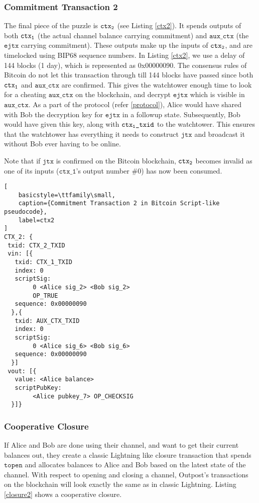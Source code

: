 \subsubsection{Commitment Transaction 2}
The final piece of the puzzle is $\texttt{ctx\textsubscript{2}}$ (see Listing \ref{ctx2}). It spends outputs of both $\texttt{ctx\textsubscript{1}}$ (the actual channel balance carrying commitment) and $\texttt{aux\_ctx}$ (the $\texttt{ejtx}$ carrying commitment). These outputs make up the inputs of $\texttt{ctx\textsubscript{2}}$, and are timelocked using BIP68 \cite{BIP68} sequence numbers. In Listing \ref{ctx2}, we use a delay of 144 blocks (1 day), which is represented as 0x00000090. The consensus rules of Bitcoin do not let this transaction through till 144 blocks have passed since both $\texttt{ctx\textsubscript{1}}$ and $\texttt{aux\_ctx}$ are confirmed. This gives the watchtower enough time to look for a cheating $\texttt{aux\_ctx}$ on the blockchain, and decrypt $\texttt{ejtx}$ which is visible in $\texttt{aux\_ctx}$. As a part of the protocol (refer \ref{protocol}), Alice would have shared with Bob the decryption key for $\texttt{ejtx}$ in a followup state. Subsequently, Bob would have given this key, along with $\texttt{ctx\textsubscript{1}\_txid}$ to the watchtower. This ensures that the watchtower has everything it needs to construct $\texttt{jtx}$ and broadcast it without Bob ever having to be online. 

Note that if $\texttt{jtx}$ is confirmed on the Bitcoin blockchain, $\texttt{ctx\textsubscript{2}}$ becomes invalid as one of its inputs ($\texttt{ctx_1}$'s output number \#0) has now been consumed. 

\begin{lstlisting}[
    basicstyle=\ttfamily\small,
    caption={Commitment Transaction 2 in Bitcoin Script-like pseudocode},
    label=ctx2
]
CTX_2: {
 txid: CTX_2_TXID
 vin: [{
   txid: CTX_1_TXID
   index: 0
   scriptSig: 
        0 <Alice sig_2> <Bob sig_2>
        OP_TRUE
   sequence: 0x00000090
  },{
   txid: AUX_CTX_TXID
   index: 0
   scriptSig: 
        0 <Alice sig_6> <Bob sig_6>
   sequence: 0x00000090
  }]
 vout: [{
   value: <Alice balance>
   scriptPubKey: 
        <Alice pubkey_7> OP_CHECKSIG
  }]}
\end{lstlisting}

\subsubsection{Cooperative Closure}
If Alice and Bob are done using their channel, and want to get their current balances out, they create a classic Lightning like closure transaction that spends $\texttt{topen}$ and allocates balances to Alice and Bob based on the latest state of the channel. With respect to opening and closing a channel, Outpost's transactions on the blockchain will look exactly the same as in classic Lightning. Listing \ref{closure2} shows a cooperative closure.

